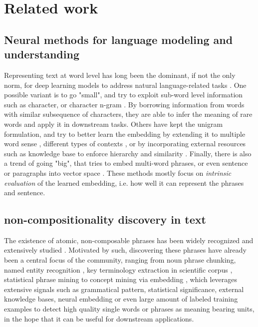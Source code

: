 

\section{Related work}\label{sec:bert_mwe_related_work}
\subsection{Neural methods for language modeling and understanding}
Representing text at word level has long been the dominant, if not the only norm, for deep learning models to address natural language-related tasks  \cite{collobert2011natural, wu2016google, conneau2017very, severyn2015learning}. 
One possible variant is to go "small", and try to exploit sub-word level information such as character, or character n-gram \cite{wieting2016charagram, bojanowski2016enriching, pinter2017mimicking}. By borrowing information from words with similar subsequence of characters, they are able to infer the meaning of rare words and apply it in downstream tasks. 
Others have kept the unigram formulation, and try to better learn the embedding by extending it to multiple word sense \cite{neelakantan2015efficient, athiwaratkun2017multimodal}, 
different types of contexts \cite{levy2014dependency, melamud2016role}, 
or by incorporating external resources such as knowledge base to enforce hierarchy and similarity \cite{nickel2017poincare, faruqui2014retrofitting}. 
Finally, there is also a trend of going "big", that tries to embed multi-word phrases, or even sentence or paragraphs into vector space \cite{mikolov2013distributed, hill2015dictionary, arora2016simple}.
These methods mostly focus on \emph{intrinsic evaluation} of the learned embedding, i.e. how well it can represent the phrases and sentence.

\subsection{non-compositionality discovery in text}
The existence of atomic, non-composable phrases has been widely recognized and extensively studied \cite{sag2002multiword, baldwin2010multiword, constant2017multiword, hashimoto2016adaptive}. 
Motivated by such, discovering these phrases have already been a central focus of the community, 
ranging from noun phrase chunking, named entity recognition \cite{nadeau2007survey, baldwin2010multiword, pecina2006combining, sporleder2009unsupervised, hashimoto2008construction},
key terminology extraction in scientific corpus \cite{beliga2015overview, zhang2008comparative}, statistical phrase mining \cite{segphrase, autophrase} to concept mining via embedding \cite{li2018concept}, 
which leverages extensive signals such as grammatical pattern, statistical significance, external knowledge bases, neural embedding or even large amount of labeled training examples to detect high quality single words or phrases as meaning bearing units, in the hope that it can be useful for downstream applications.


